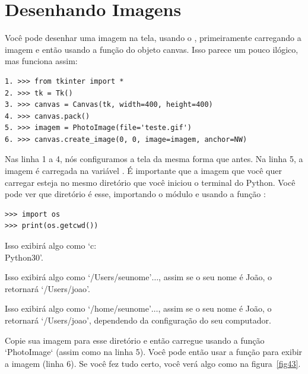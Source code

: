 \section{Desenhando Imagens}

Você pode desenhar uma imagem na tela, usando o , primeiramente carregando a imagem e então usando a função  do objeto canvas. Isso parece um pouco ilógico, mas funciona assim:

\begin{listing}
\begin{verbatim}
1. >>> from tkinter import *
2. >>> tk = Tk()
3. >>> canvas = Canvas(tk, width=400, height=400)
4. >>> canvas.pack()
5. >>> imagem = PhotoImage(file='teste.gif')
6. >>> canvas.create_image(0, 0, image=imagem, anchor=NW)
\end{verbatim}
\end{listing}

Nas linha 1 a 4, nós configuramos a tela da mesma forma que antes. Na linha 5, a imagem é carregada na variável . É importante que a imagem que você quer carregar esteja no mesmo diretório que você iniciou o terminal do Python. Você pode ver que diretório é esse, importando o módulo  e usando a função :

\begin{listing}
\begin{verbatim}
>>> import os
>>> print(os.getcwd())
\end{verbatim}
\end{listing}

\begin{WINDOWS}
Isso exibirá algo como `c:\\Python30'.
\end{WINDOWS}

\begin{MAC}
Isso exibirá algo como `/Users/seunome'$\ldots$, assim se o seu nome é João, o  retornará `/Users/joao'.
\end{MAC}

\begin{LINUX}
Isso exibirá algo como `/home/seunome'$\ldots$, assim se o seu nome é João, o  retornará `/Users/joao', dependendo da configuração do seu computador.
\end{LINUX}

Copie sua imagem para esse diretório e então carregue usando a função `PhotoImage` (assim como na linha 5). Você pode então usar a função  para exibir a imagem (linha 6). Se você fez tudo certo, você verá algo como na figura~\ref{fig43}.

